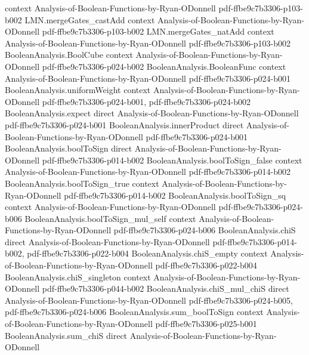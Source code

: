 \begin{lemma}
  {context}
  {Analysis-of-Boolean-Functions-by-Ryan-ODonnell}
  {pdf-ffbe9c7b3306-p103-b002}
\proofstep
  {LMN.mergeGates_castAdd}
  {context}
  {Analysis-of-Boolean-Functions-by-Ryan-ODonnell}
  {pdf-ffbe9c7b3306-p103-b002}
\proofstep
  {LMN.mergeGates_natAdd}
  {context}
  {Analysis-of-Boolean-Functions-by-Ryan-ODonnell}
  {pdf-ffbe9c7b3306-p103-b002}
\proofstep
  {BooleanAnalysis.BoolCube}
  {context}
  {Analysis-of-Boolean-Functions-by-Ryan-ODonnell}
  {pdf-ffbe9c7b3306-p024-b002}
\proofstep
  {BooleanAnalysis.BooleanFunc}
  {context}
  {Analysis-of-Boolean-Functions-by-Ryan-ODonnell}
  {pdf-ffbe9c7b3306-p024-b001}
\proofstep
  {BooleanAnalysis.uniformWeight}
  {context}
  {Analysis-of-Boolean-Functions-by-Ryan-ODonnell}
  {pdf-ffbe9c7b3306-p024-b001,
    pdf-ffbe9c7b3306-p024-b002}
\proofstep
  {BooleanAnalysis.expect}
  {direct}
  {Analysis-of-Boolean-Functions-by-Ryan-ODonnell}
  {pdf-ffbe9c7b3306-p024-b001}
\proofstep
  {BooleanAnalysis.innerProduct}
  {direct}
  {Analysis-of-Boolean-Functions-by-Ryan-ODonnell}
  {pdf-ffbe9c7b3306-p024-b001}
\proofstep
  {BooleanAnalysis.boolToSign}
  {direct}
  {Analysis-of-Boolean-Functions-by-Ryan-ODonnell}
  {pdf-ffbe9c7b3306-p014-b002}
\proofstep
  {BooleanAnalysis.boolToSign_false}
  {context}
  {Analysis-of-Boolean-Functions-by-Ryan-ODonnell}
  {pdf-ffbe9c7b3306-p014-b002}
\proofstep
  {BooleanAnalysis.boolToSign_true}
  {context}
  {Analysis-of-Boolean-Functions-by-Ryan-ODonnell}
  {pdf-ffbe9c7b3306-p014-b002}
\proofstep
  {BooleanAnalysis.boolToSign_sq}
  {context}
  {Analysis-of-Boolean-Functions-by-Ryan-ODonnell}
  {pdf-ffbe9c7b3306-p024-b006}
\proofstep
  {BooleanAnalysis.boolToSign_mul_self}
  {context}
  {Analysis-of-Boolean-Functions-by-Ryan-ODonnell}
  {pdf-ffbe9c7b3306-p024-b006}
\proofstep
  {BooleanAnalysis.chiS}
  {direct}
  {Analysis-of-Boolean-Functions-by-Ryan-ODonnell}
  {pdf-ffbe9c7b3306-p014-b002,
    pdf-ffbe9c7b3306-p022-b004}
\proofstep
  {BooleanAnalysis.chiS_empty}
  {context}
  {Analysis-of-Boolean-Functions-by-Ryan-ODonnell}
  {pdf-ffbe9c7b3306-p022-b004}
\proofstep
  {BooleanAnalysis.chiS_singleton}
  {context}
  {Analysis-of-Boolean-Functions-by-Ryan-ODonnell}
  {pdf-ffbe9c7b3306-p044-b002}
\proofstep
  {BooleanAnalysis.chiS_mul_chiS}
  {direct}
  {Analysis-of-Boolean-Functions-by-Ryan-ODonnell}
  {pdf-ffbe9c7b3306-p024-b005,
    pdf-ffbe9c7b3306-p024-b006}
\proofstep
  {BooleanAnalysis.sum_boolToSign}
  {context}
  {Analysis-of-Boolean-Functions-by-Ryan-ODonnell}
  {pdf-ffbe9c7b3306-p025-b001}
\proofstep
  {BooleanAnalysis.sum_chiS}
  {direct}
  {Analysis-of-Boolean-Functions-by-Ryan-ODonnell}

\end{lemma}
